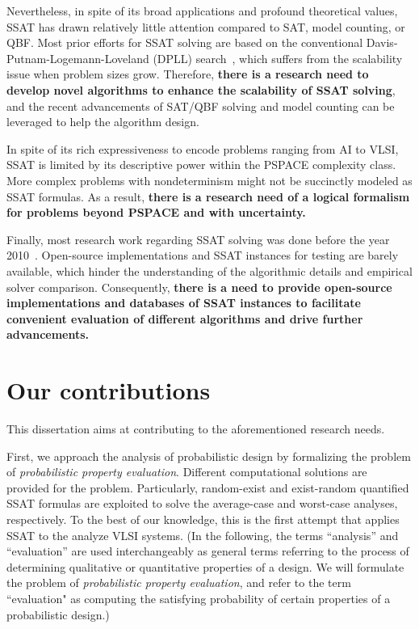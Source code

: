 Nevertheless, in spite of its broad applications and profound theoretical values,
SSAT has drawn relatively little attention compared to SAT, model counting, or QBF.
Most prior efforts for SSAT solving are based on the conventional
Davis-Putnam-Logemann-Loveland (DPLL) search~\cite{Davis1962},
which suffers from the scalability issue when problem sizes grow.
Therefore, \textbf{there is a research need to develop novel algorithms to enhance the scalability of SSAT solving},
and the recent advancements of SAT/QBF solving and model counting can be leveraged to help the algorithm design.

In spite of its rich expressiveness to encode problems ranging from AI to VLSI,
SSAT is limited by its descriptive power within the PSPACE complexity class.
More complex problems with nondeterminism might not be succinctly modeled as SSAT formulas.
As a result, \textbf{there is a research need of a logical formalism for problems beyond PSPACE and with uncertainty.}

Finally, most research work regarding SSAT solving was done
before the year 2010~\cite{Majercik1998,Majercik2003,Majercik2004,Majercik2005,Teige2010,SATHandbook-SSAT}.
Open-source implementations and SSAT instances for testing are barely available,
which hinder the understanding of the algorithmic details and empirical solver comparison.
Consequently, \textbf{there is a need to provide open-source implementations and databases of SSAT instances to facilitate convenient evaluation of different algorithms and drive further advancements.}

\section{Our contributions}
This dissertation aims at contributing to the aforementioned research needs.

First, we approach the analysis of probabilistic design by
formalizing the problem of \textit{probabilistic property evaluation}.
Different computational solutions are provided for the problem.
Particularly, random-exist and exist-random quantified SSAT formulas are exploited
to solve the average-case and worst-case analyses, respectively.
To the best of our knowledge,
this is the first attempt that applies SSAT to the analyze VLSI systems.
(In the following,
the terms ``analysis'' and ``evaluation'' are used interchangeably as general terms
referring to the process of determining qualitative or quantitative properties of a design.
We will formulate the problem of \textit{probabilistic property evaluation},
and refer to the term ``evaluation" as computing the satisfying probability of
certain properties of a probabilistic design.)

